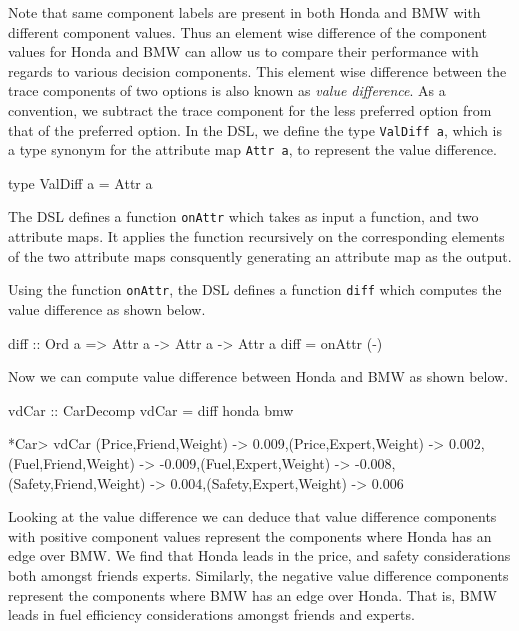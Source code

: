 \documentclass{jfp}
\newcommand{\prog}[1]{\texttt{#1}}
\begin{document}
Note that same component labels are present in both Honda and BMW with different component values. Thus an element wise difference of the component values for Honda and BMW can allow us to compare their performance with regards to various decision components. This element wise difference between the trace components of two options is also known as \emph{value difference}. As a convention, we subtract the trace component for the less preferred option from that of the preferred option. In the DSL, we define the type \prog{ValDiff a}, which is a type synonym for the attribute map \prog{Attr a}, to represent the value difference. 
\begin{haskellcode}
type ValDiff a = Attr a 
\end{haskellcode}
The DSL defines a function \prog{onAttr} which takes as input a function, and two attribute maps. It applies the function recursively on the corresponding elements of the two attribute maps consquently generating an attribute map as the output. 
Using the function \prog{onAttr}, the DSL defines a function \prog{diff} which computes the value difference as shown below. 
\begin{haskellcode}
diff :: Ord a => Attr a -> Attr a -> Attr a
diff = onAttr (-)
\end{haskellcode}
Now we can compute value difference between Honda and BMW as shown below. 
\begin{haskellcode}
vdCar :: CarDecomp
vdCar = diff honda bmw

*Car> vdCar
{(Price,Friend,Weight) -> 0.009,(Price,Expert,Weight) -> 0.002,
 (Fuel,Friend,Weight) -> -0.009,(Fuel,Expert,Weight) -> -0.008,
 (Safety,Friend,Weight) -> 0.004,(Safety,Expert,Weight) -> 0.006}
\end{haskellcode}
Looking at the value difference we can deduce that value difference components with positive component values represent the components where Honda has an edge over BMW. We find that Honda leads in the price, and safety considerations both amongst friends experts. Similarly, the negative value difference components represent the components where BMW has an edge over Honda. That is, BMW leads in fuel efficiency considerations amongst friends and experts. 
\end{document}
